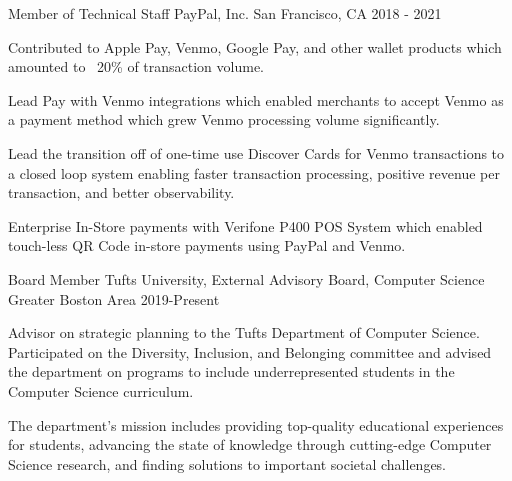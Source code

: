 
\begin{cventries}

  \cventry
    {Member of Technical Staff} %
    {PayPal, Inc.} %
    {San Francisco, CA} %
    {2018 - 2021} %
    {
      \begin{cvitems} %
        \item {Contributed to Apple Pay, Venmo, Google Pay, and other wallet products which amounted to ~20\% of transaction volume.}
        \item {Lead Pay with Venmo integrations which enabled merchants to accept Venmo as a payment method which grew Venmo processing volume significantly.}
        \item {Lead the transition off of one-time use Discover Cards for Venmo transactions to a closed loop system enabling faster transaction processing, positive revenue per transaction, and better observability.}
        \item {Enterprise In-Store payments with Verifone P400 POS System which enabled touch-less QR Code in-store payments using PayPal and Venmo.}
      \end{cvitems}
    }

  \cventry
    {Board Member} %
    {Tufts University, External Advisory Board, Computer Science} %
    {Greater Boston Area} %
    {2019-Present} %
    {
      \begin{cvitems} %
      \item {Advisor on strategic planning to the Tufts Department of Computer Science. Participated on the Diversity, Inclusion, and Belonging committee and advised the department on programs to include underrepresented students in the Computer Science curriculum.}
      \item {The department's mission includes providing top-quality educational experiences for students, advancing the state of knowledge through cutting-edge Computer Science research, and finding solutions to important societal challenges.}
      \end{cvitems}
    }


\end{cventries}
